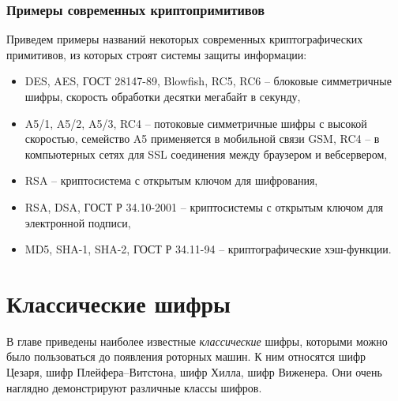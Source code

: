 \documentclass[10pt,a4paper]{book}
\begin{document}




\subsection{Примеры современных криптопримитивов}

Приведем примеры названий некоторых современных криптографических примитивов, из которых строят системы защиты информации:
\begin{itemize}
    \item DES, AES, ГОСТ 28147-89, Blowfish, RC5, RC6 -- блоковые симметричные шифры, скорость обработки десятки мегабайт в секунду,
    \item A5/1, A5/2, A5/3, RC4 -- потоковые симметричные шифры с высокой скоростью, семейство A5 применяется в мобильной связи GSM, RC4 -- в компьютерных сетях для SSL соединения между браузером и вебсервером,
    \item RSA -- криптосистема с открытым ключом для шифрования,
    \item RSA, DSA, ГОСТ Р 34.10-2001 -- криптосистемы с открытым ключом для электронной подписи,
    \item MD5, SHA-1, SHA-2, ГОСТ Р 34.11-94 -- криптографические хэш-функции.
\end{itemize}





\chapter{Классические шифры}

В главе приведены наиболее известные \emph{классические} шифры, которыми можно было пользоваться до появления роторных машин. К ним относятся шифр Цезаря, шифр Плейфера--Витстона, шифр Хилла, шифр Виженера. Они очень наглядно демонстрируют различные классы шифров.







%
\end{document}
